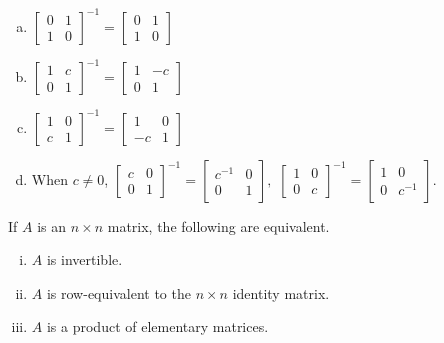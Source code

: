 \documentclass[12pt,letterpaper,reqno]{article}
\numberwithin{equation}{section}
\begin{document}
\begin{example}
\begin{enumerate}[(a)]
	\item $\begin{bmatrix}
		0&1 \\ 1&0
	\end{bmatrix}^{-1}=  \begin{bmatrix}
		0 & 1 \\ 1 & 0
	\end{bmatrix}$
	\item $\begin{bmatrix}
		1&c \\ 0&1
	\end{bmatrix}^{-1}= \begin{bmatrix}1 & -c \\ 0 & 1 \end{bmatrix}$
	\item $\begin{bmatrix}
		1&0 \\ c&1
	\end{bmatrix}^{-1}=\begin{bmatrix}
		1 & 0 \\ -c & 1
	\end{bmatrix}$
	\item When $c \neq 0$,
	$\begin{bmatrix}
		c&0 \\ 0&1
	\end{bmatrix}^{-1}=\begin{bmatrix}
		c^{-1} & 0 \\ 0 & 1
	\end{bmatrix},$ \hspace{0.5cm} $\begin{bmatrix}
		1&0 \\ 0 &c
	\end{bmatrix}^{-1}= \begin{bmatrix}
		1 & 0 \\ 0 & c^{-1}
	\end{bmatrix}.$
\end{enumerate}
\end{example}

\begin{thm}\label{thm:invertible_matrix_theorem}
	If $A$ is an $n \times n$ matrix, the following are equivalent.
	\begin{enumerate}[(i)]
		\item $A$ is invertible.
		\item $A$ is row-equivalent to the $n \times n$ identity matrix.
		\item $A$ is a product of elementary matrices.
	\end{enumerate} 	
\end{thm}
\end{document}
